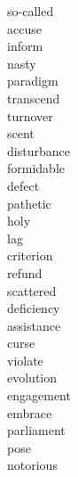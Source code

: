 \documentclass[a4paper, 10pt]{ctexart}
\begin{document}
\begin{multicols*}{2}
\begin{description}
\item[so-called]

\item[accuse]

\item[inform]

\item[nasty]

\item[paradigm]

\item[transcend]

\item[turnover]

\item[scent]

\item[disturbance]

\item[formidable]

\item[defect]

\item[pathetic]

\item[holy]

\item[lag]

\item[criterion]

\item[refund]

\item[scattered]

\item[deficiency]

\item[assistance]

\item[curse]

\item[violate]

\item[evolution]

\item[engagement]

\item[embrace]

\item[parliament]

\item[pose]

\item[notorious]


\end{description}
\end{multicols*}
\end{document}
